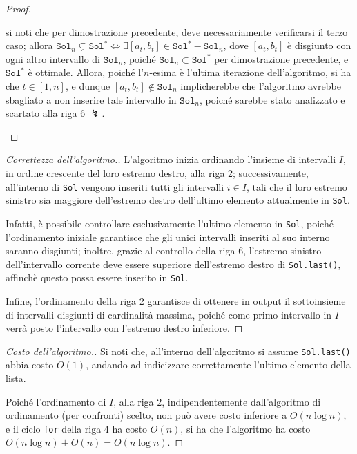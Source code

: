 \documentclass[a4paper, 12pt]{report}
\begin{document}
\begin{proof}
\begin{itemize}
                si noti che per dimostrazione precedente, deve necessariamente verificarsi il terzo caso; allora $\texttt{Sol}_n \subsetneq \texttt{Sol}^* \iff \exists[a_t, b_t] \in \texttt{Sol}^* - \texttt{Sol}_n$, dove $[a_t, b_t]$ è disgiunto con ogni altro intervallo di $\texttt{Sol}_n$, poiché $\texttt{Sol}_n \subset \texttt{Sol}^*$ per dimostrazione precedente, e $\texttt{Sol}^*$ è ottimale. Allora, poiché l'$n$-esima è l'ultima iterazione dell'algoritmo, si ha che $t \in [1, n]$, e dunque $[a_t, b_t] \notin \texttt{Sol}_n$ implicherebbe che l'algoritmo avrebbe sbagliato a non inserire tale intervallo in $\texttt{Sol}_n$, poiché sarebbe stato analizzato e scartato alla riga 6 $\lightning$.
        \end{itemize}
    \end{proof}

    \begin{proof}[Correttezza dell'algoritmo.]
        L'algoritmo inizia ordinando l'insieme di intervalli $I$, in ordine crescente del loro estremo destro, alla riga 2; successivamente, all'interno di \texttt{Sol} vengono inseriti tutti gli intervalli $i \in I$, tali che il loro estremo sinistro sia maggiore dell'estremo destro dell'ultimo elemento attualmente in \texttt{Sol}.

        Infatti, è possibile controllare esclusivamente l'ultimo elemento in \texttt{Sol}, poiché l'ordinamento iniziale garantisce che gli unici intervalli inseriti al suo interno saranno disgiunti; inoltre, grazie al controllo della riga 6, l'estremo sinistro dell'intervallo corrente deve essere superiore dell'estremo destro di \texttt{Sol.last()}, affinchè questo possa essere inserito in \texttt{Sol}.

        Infine, l'ordinamento della riga 2 garantisce di ottenere in output il sottoinsieme di intervalli disgiunti di cardinalità massima, poiché come primo intervallo in $I$ verrà posto l'intervallo con l'estremo destro inferiore.
    \end{proof}

    \begin{proof}[Costo dell'algoritmo.]
        Si noti che, all'interno dell'algoritmo si assume \texttt{Sol.last()} abbia costo $O(1)$, andando ad indicizzare correttamente l'ultimo elemento della lista.

        Poiché l'ordinamento di $I$, alla riga 2, indipendentemente dall'algoritmo di ordinamento (per confronti) scelto, non può avere costo inferiore a $O(n \log n)$, e il ciclo \texttt{for} della riga 4 ha costo $O(n)$, si ha che l'algoritmo ha costo $O(n \log n) + O(n) = O(n \log n)$.
    \end{proof}
\end{document}
